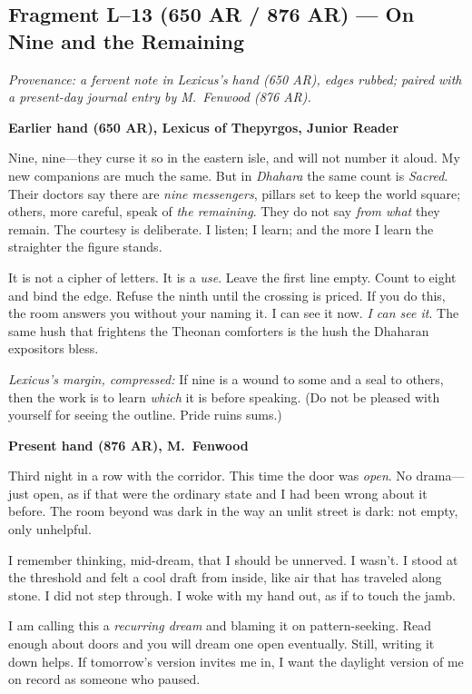 \documentclass[11pt]{article}
\begin{document}
\subsection{Fragment L--13 (650 AR / 876 AR) --- On Nine and the Remaining}
\label{frag:l13}
{}

\noindent\textit{Provenance: a fervent note in Lexicus’s hand (650 AR), edges rubbed; paired with a present-day journal entry by M.\ Fenwood (876 AR).}

\medskip
\noindent\textbf{Earlier hand (650 AR), Lexicus of Thepyrgos, Junior Reader}

Nine, nine—they curse it so in the eastern isle, and will not number it aloud. My new companions are much the same. But in \textit{Dhahara} the same count is \emph{Sacred}. Their doctors say there are \emph{nine messengers}, pillars set to keep the world square; others, more careful, speak of \emph{the remaining}. They do not say \emph{from what} they remain. The courtesy is deliberate. I listen; I learn; and the more I learn the straighter the figure stands.

It is not a cipher of letters. It is a \emph{use}. Leave the first line empty. Count to eight and bind the edge. Refuse the ninth until the crossing is priced. If you do this, the room answers you without your naming it. I can see it now. \emph{I can see it}. The same hush that frightens the Theonan comforters is the hush the Dhaharan expositors bless.

\medskip
\noindent\textit{Lexicus’s margin, compressed:} If nine is a wound to some and a seal to others, then the work is to learn \emph{which} it is before speaking. (Do not be pleased with yourself for seeing the outline. Pride ruins sums.)

\medskip
\noindent\textbf{Present hand (876 AR), M.\ Fenwood}

Third night in a row with the corridor. This time the door was \emph{open}. No drama—just open, as if that were the ordinary state and I had been wrong about it before. The room beyond was dark in the way an unlit street is dark: not empty, only unhelpful.

I remember thinking, mid-dream, that I should be unnerved. I wasn’t. I stood at the threshold and felt a cool draft from inside, like air that has traveled along stone. I did not step through. I woke with my hand out, as if to touch the jamb.

I am calling this a \emph{recurring dream} and blaming it on pattern-seeking. Read enough about doors and you will dream one open eventually. Still, writing it down helps. If tomorrow’s version invites me in, I want the daylight version of me on record as someone who paused.
\end{document}
